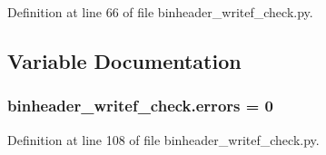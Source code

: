 Definition at line 66 of file binheader\+\_\+writef\+\_\+check.\+py.



\subsection{Variable Documentation}
\subsubsection[{\texorpdfstring{errors}{errors}}]{ binheader\+\_\+writef\+\_\+check.\+errors = 0}\hypertarget{namespacebinheader__writef__check_a3700fcaac2e0c84a48e53bc42184e068}{}\label{namespacebinheader__writef__check_a3700fcaac2e0c84a48e53bc42184e068}


Definition at line 108 of file binheader\+\_\+writef\+\_\+check.\+py.

